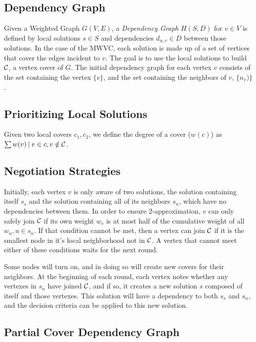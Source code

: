 \subsection{Dependency Graph}
Given a Weighted Graph $G(V,E)$, a {\em Dependency Graph} $H(S,D)$ for $v \in V$ is defined by local solutions $s \in S$ and dependencies $d_{u,v} \in D$ between those solutions. In the case of the MWVC, each solution is made up of a set of vertices that cover the edges incident to $v$. The goal is to use the local solutions to build ${\mathcal C}$, a vertex cover of $G$. The initial dependency graph for each vertex $v$ consists of the set containing the vertex $\{v\}$, and the set containing the neighbors of $v$, $\{n_v)\}$. 

\subsection{Prioritizing Local Solutions}

Given two local covers $c_1, c_2$, we define the degree of a cover ($w(c)$) as $\sum w(v)\:|\: v \in c, v \notin {\mathcal C}$.  

\subsection{Negotiation Strategies}
Initially, each vertex $v$ is only aware of two solutions, the solution containing itself $s_s$ and the solution containing all of its neighbors $s_n$, which have no dependencies between them. In order to ensure 2-approximation, $v$ can only safely join ${\mathcal C}$ if its own weight $w_v$ is at most half of the cumulative weight of all $w_u, u \in s_n $. If that condition cannot be met, then a vertex can join ${\mathcal C}$ if it is the smallest node in it's local neighborhood not in ${\mathcal C}$. A vertex that cannot meet either of these conditions waits for the next round. 

Some nodes will turn on, and in doing so will create new covers for their neighbors. At the beginning of each round, each vertex notes whether any vertexes in $s_n$ have joined ${\mathcal C}$, and if so, it creates a new solution $s$ composed of itself and those vertexes. This solution will have a dependency to both $s_s$ and $s_n$, and the decision criteria can be applied to this new solution. 

\subsection{Partial Cover Dependency Graph}

